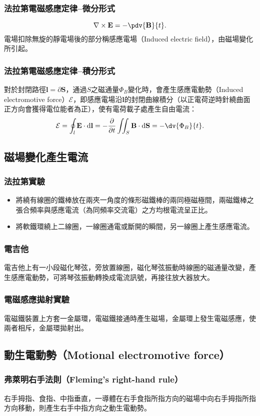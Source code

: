 \documentclass[a4paper,12pt]{report}
\begin{document}
\begin{itemize}
\subsubsection{法拉第電磁感應定律–微分形式}
\[\nabla \times \mathbf{E} = -\pdv{\mathbf{B}}{t}.\]
電場扣除無旋的靜電場後的部分稱感應電場（Induced electric field），由磁場變化所引起。
\subsubsection{法拉第電磁感應定律–積分形式}
對於封閉路徑$\mathbf{l}=\partial\mathbf{S}$，通過$S$之磁通量$\Phi_B$變化時，會產生感應電動勢（Induced electromotive force）$\mathcal{E}$，即感應電場沿$\mathbf{l}$的封閉曲線積分（以正電荷逆時針繞曲面正方向會獲得電位能者為正），使有電荷載子處產生自由電流：
\[\mathcal{E}=\oint_{l}\mathbf{E}\cdot\mathrm{d}\mathbf{l}=-\frac{\partial}{\partial t}\iint_S\mathbf{B}\cdot\mathrm{d}\mathbf{S}=-\dv{\Phi_B}{t}.\]
\subsection{磁場變化產生電流}
\subsubsection{法拉第實驗}
\begin{itemize}
\item 將繞有線圈的鐵棒放在兩夾一角度的條形磁鐵棒的兩同極磁極間，兩磁鐵棒之張合頻率與感應電流（為同頻率交流電）之方均根電流呈正比。
\item 將軟鐵環繞上二線圈，一線圈通電或斷開的瞬間，另一線圈上產生感應電流。
\end{itemize}
\subsubsection{電吉他}
電吉他上有一小段磁化琴弦，旁放置線圈，磁化琴弦振動時線圈的磁通量改變，產生感應電動勢，可將琴弦振動轉換成電流訊號，再接往放大器放大。
\subsubsection{電磁感應拋射實驗}
電磁鐵裝置上方套一金屬環，電磁鐵接通時產生磁場，金屬環上發生電磁感應，使兩者相斥，金屬環拋射出。
\subsection{動生電動勢（Motional electromotive force）}
\subsubsection{弗萊明右手法則（Fleming's right-hand rule）}
右手拇指、食指、中指垂直，一導體在右手食指所指方向的磁場中向右手拇指所指方向移動，則產生右手中指方向之動生電動勢。

\end{itemize}
\end{document}
